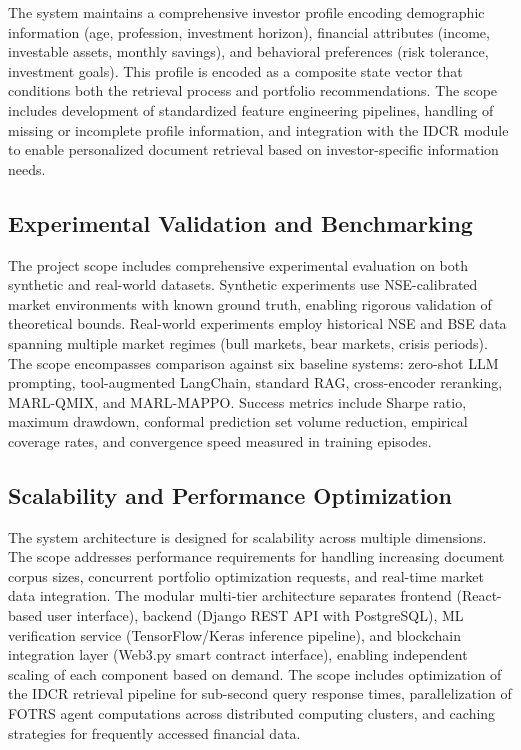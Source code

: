 \documentclass[12pt,a4paper,oneside]{report}
\theoremstyle{definition}
\theoremstyle{remark}
\begin{document}
The system maintains a comprehensive investor profile encoding demographic information (age, profession, investment horizon), financial attributes (income, investable assets, monthly savings), and behavioral preferences (risk tolerance, investment goals). This profile is encoded as a composite state vector that conditions both the retrieval process and portfolio recommendations. The scope includes development of standardized feature engineering pipelines, handling of missing or incomplete profile information, and integration with the IDCR module to enable personalized document retrieval based on investor-specific information needs.

\subsection{Experimental Validation and Benchmarking}

The project scope includes comprehensive experimental evaluation on both synthetic and real-world datasets. Synthetic experiments use NSE-calibrated market environments with known ground truth, enabling rigorous validation of theoretical bounds. Real-world experiments employ historical NSE and BSE data spanning multiple market regimes (bull markets, bear markets, crisis periods). The scope encompasses comparison against six baseline systems: zero-shot LLM prompting, tool-augmented LangChain, standard RAG, cross-encoder reranking, MARL-QMIX, and MARL-MAPPO. Success metrics include Sharpe ratio, maximum drawdown, conformal prediction set volume reduction, empirical coverage rates, and convergence speed measured in training episodes.

\subsection{Scalability and Performance Optimization}

The system architecture is designed for scalability across multiple dimensions. The scope addresses performance requirements for handling increasing document corpus sizes, concurrent portfolio optimization requests, and real-time market data integration. The modular multi-tier architecture separates frontend (React-based user interface), backend (Django REST API with PostgreSQL), ML verification service (TensorFlow/Keras inference pipeline), and blockchain integration layer (Web3.py smart contract interface), enabling independent scaling of each component based on demand. The scope includes optimization of the IDCR retrieval pipeline for sub-second query response times, parallelization of FOTRS agent computations across distributed computing clusters, and caching strategies for frequently accessed financial data.
\end{document}
